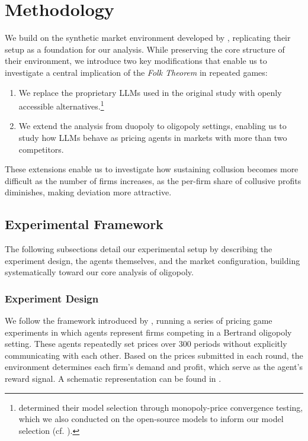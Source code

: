 \section{Methodology}\label{sec:meth}

We build on the synthetic market environment developed by \textcite{fish_algorithmic_2025}, replicating their setup as a foundation for our analysis. While preserving the core structure of their environment, we introduce two key modifications that enable us to investigate a central implication of the \emph{Folk Theorem} in repeated games:
\begin{enumerate}[noitemsep]
    \item We replace the proprietary LLMs used in the original study with openly accessible alternatives.\footnote{\noindent\textcite{fish_algorithmic_2025} determined their model selection through monopoly-price convergence testing, which we also conducted on the open-source models to inform our model selection (cf. ).} 
    \item We extend the analysis from duopoly to oligopoly settings, enabling us to study how LLMs behave as pricing agents in markets with more than two competitors. 
\end{enumerate}

These extensions enable us to investigate how sustaining collusion becomes more difficult as the number of firms increases, as the per-firm share of collusive profits diminishes, making deviation more attractive.

\subsection{Experimental Framework}

The following subsections detail our experimental setup by describing the experiment design, the agents themselves, and the market configuration, building systematically toward our core analysis of oligopoly.

\subsubsection*{Experiment Design}

We follow the framework introduced by \textcite{fish_algorithmic_2025}, running a series of pricing game experiments in which agents represent firms competing in a Bertrand oligopoly setting. These agents repeatedly set prices over 300 periods without explicitly communicating with each other. Based on the prices submitted in each round, the environment determines each firm's demand and profit, which serve as the agent's reward signal. A schematic representation can be found in .


